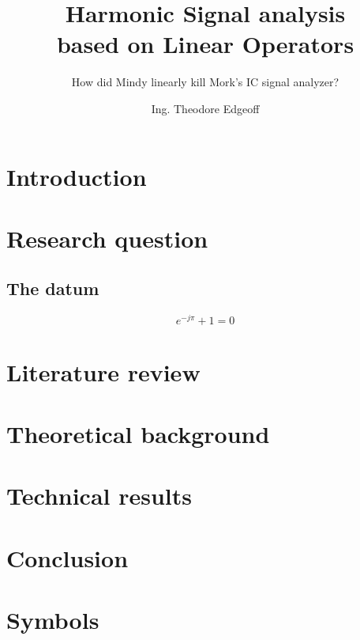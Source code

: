 \documentclass[ti,10pt,twoside,openright,filled,cameraready]{uantwerpenphdthesis}
\title{Harmonic Signal analysis \\based on Linear Operators}
\subtitle{How did Mindy linearly kill Mork's IC signal analyzer?}
\author{Ing. Theodore Edgeoff}
\affiliation{University of Antwerp\\
  Faculty of Applied Engineering\\
  Cosys-Lab}
\begin{document}
\maketitle

\frontmatter

\tableofcontents

\mainmatter
\chapter*{Introduction}

\kant[1]

\chapter{Research question}

\section{The datum}

\kant[2]

\begin{equation}
  e^{-j\pi} + 1 = 0
\end{equation}

\kant[3-17]

\chapter{Literature review}

\kant[18-19]

\chapter{Theoretical background}

\kant[20-21]

\chapter{Technical results}

\kant[22-24]

\chapter{Conclusion}

\kant[25]

\appendix

\chapter{Symbols}


\makefinalpage
\end{document}
